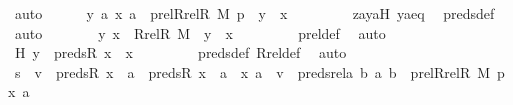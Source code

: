 \begin{isabellebody}
\ auto\isanewline
\isanewline
\ \ \ \ \isamarkupfalse%
\ {\isachardoublequoteopen}{\isacharless}{\kern0pt}{\isacharless}{\kern0pt}y{\isacharcomma}{\kern0pt}\ a{\isachargreater}{\kern0pt}{\isacharcomma}{\kern0pt}\ {\isacharless}{\kern0pt}x{\isacharcomma}{\kern0pt}\ a{\isachargreater}{\kern0pt}{\isachargreater}{\kern0pt}\ {\isasymin}\ prel{\isacharparenleft}{\kern0pt}Rrel{\isacharparenleft}{\kern0pt}R{\isacharcomma}{\kern0pt}\ M{\isacharparenright}{\kern0pt}{\isacharcomma}{\kern0pt}\ p{\isacharparenright}{\kern0pt}\ {\isasymor}\ y\ {\isacharequal}{\kern0pt}\ x{\isachardoublequoteclose}\ \isanewline
\ \ \ \ \ \ \isamarkupfalse%
\ zayaH\ yaeq\ \isamarkupfalse%
\ preds{\isacharunderscore}{\kern0pt}def\ \isamarkupfalse%
\ auto\isanewline
\ \ \ \ \isamarkupfalse%
\ \isamarkupfalse%
\ {\isachardoublequoteopen}{\isacharless}{\kern0pt}y{\isacharcomma}{\kern0pt}\ x{\isachargreater}{\kern0pt}\ {\isasymin}\ Rrel{\isacharparenleft}{\kern0pt}R{\isacharcomma}{\kern0pt}\ M{\isacharparenright}{\kern0pt}\ {\isasymor}\ y\ {\isacharequal}{\kern0pt}\ x{\isachardoublequoteclose}\ \isanewline
\ \ \ \ \ \ \isamarkupfalse%
\ prel{\isacharunderscore}{\kern0pt}def\ \isamarkupfalse%
\ auto\ \isanewline
\ \ \ \ \isamarkupfalse%
\ \isamarkupfalse%
\ H{}{\isacharcolon}{\kern0pt}\ {\isachardoublequoteopen}y\ {\isasymin}\ preds{\isacharparenleft}{\kern0pt}R{\isacharcomma}{\kern0pt}\ x{\isacharparenright}{\kern0pt}\ {\isasymunion}\ {\isacharbraceleft}{\kern0pt}x{\isacharbraceright}{\kern0pt}{\isachardoublequoteclose}\ \isanewline
\ \ \ \ \ \ \isamarkupfalse%
\ preds{\isacharunderscore}{\kern0pt}def\ Rrel{\isacharunderscore}{\kern0pt}def\ \isamarkupfalse%
\ auto\ \isanewline
\isanewline
\ \ \ \ \isamarkupfalse%
\ {\isachardoublequoteopen}s\ {\isasymin}\ {\isacharbraceleft}{\kern0pt}v\ {\isasymin}\ {\isacharparenleft}{\kern0pt}preds{\isacharparenleft}{\kern0pt}R{\isacharcomma}{\kern0pt}\ x{\isacharparenright}{\kern0pt}\ {\isasymtimes}\ {\isacharbraceleft}{\kern0pt}a{\isacharbraceright}{\kern0pt}{\isacharparenright}{\kern0pt}\ {\isasymtimes}\ {\isacharparenleft}{\kern0pt}preds{\isacharparenleft}{\kern0pt}R{\isacharcomma}{\kern0pt}\ x{\isacharparenright}{\kern0pt}\ {\isasymtimes}\ {\isacharbraceleft}{\kern0pt}a{\isacharbraceright}{\kern0pt}\ {\isasymunion}\ {\isacharbraceleft}{\kern0pt}{\isasymlangle}x{\isacharcomma}{\kern0pt}\ a{\isasymrangle}{\isacharbraceright}{\kern0pt}{\isacharparenright}{\kern0pt}\ {\isachardot}{\kern0pt}\ v\ {\isasymin}\ preds{\isacharunderscore}{\kern0pt}rel{\isacharparenleft}{\kern0pt}{\isasymlambda}a\ b{\isachardot}{\kern0pt}\ {\isasymlangle}a{\isacharcomma}{\kern0pt}\ b{\isasymrangle}\ {\isasymin}\ prel{\isacharparenleft}{\kern0pt}Rrel{\isacharparenleft}{\kern0pt}R{\isacharcomma}{\kern0pt}\ M{\isacharparenright}{\kern0pt}{\isacharcomma}{\kern0pt}\ p{\isacharparenright}{\kern0pt}{\isacharcomma}{\kern0pt}\ {\isasymlangle}x{\isacharcomma}{\kern0pt}\ a{\isasymrangle}{\isacharparenright}{\kern0pt}{\isacharbraceright}{\kern0pt}{\isachardoublequoteclose}\ \isanewline

\end{isabellebody}
